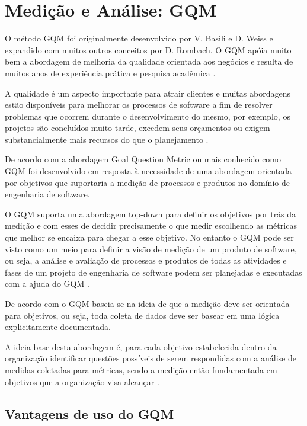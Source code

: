 \section{Medição e Análise: GQM}

O método GQM foi originalmente desenvolvido por V. Basili e D. Weiss e expandido com muitos outros conceitos por D.  Rombach. O GQM apóia muito bem a abordagem de melhoria da qualidade orientada aos negócios e resulta de muitos anos de experiência prática e pesquisa acadêmica \cite{solingen}.

A qualidade é um aspecto importante para atrair clientes e muitas abordagens estão disponíveis para melhorar os processos de software a fim de resolver problemas que ocorrem durante o desenvolvimento do mesmo, por exemplo, os projetos são concluídos muito tarde, excedem seus orçamentos ou exigem substancialmente mais recursos do que o planejamento \cite{solingen}.

De acordo com \cite{differding} a abordagem Goal Question Metric ou mais conhecido como GQM foi desenvolvido em resposta à necessidade de uma abordagem orientada por objetivos que suportaria a medição de processos e produtos no domínio de engenharia de software.

O GQM suporta uma abordagem top-down para definir os objetivos por trás da medição e com esses de decidir precisamente o que medir escolhendo as métricas que melhor se encaixa para chegar a esse objetivo. No entanto o GQM pode ser visto como um meio para definir a visão de medição de um produto de software, ou seja, a análise e avaliação de processos e produtos de todas as atividades e fases de um projeto de engenharia de software podem ser planejadas e executadas com a ajuda do GQM \cite{differding}.

De acordo com \cite{differding} o GQM baseia-se na ideia de que a medição deve ser orientada para objetivos, ou seja, toda coleta de dados deve ser basear em uma lógica explicitamente documentada.

A ideia base desta abordagem é, para cada objetivo estabelecida dentro da organização identificar questões possíveis de
serem respondidas com a análise de medidas coletadas para métricas, sendo a medição então fundamentada em objetivos que
a organização visa alcançar \cite{junior}.

\subsection{Vantagens de uso do GQM}

